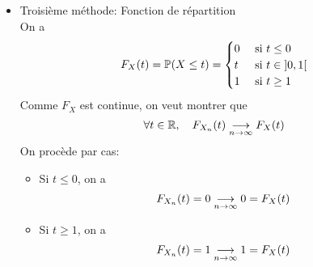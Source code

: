 {\begin{td-sol}
\begin{itemize}[\ptr{}]
            Pour \(t=0\), on a
            \begin{equation*}
                \varphi(X_n)(0)=1 \cvn \varphi_U(0)
            \end{equation*}


            \item Troisième méthode: Fonction de répartition\\
            On a
            \begin{equation*}
                F_X(t) = \mathbb{P}(X\leq t) = \begin{cases}
                    0&\text{ si }t\leq0\\
                    t&\text{ si }t\in\mathopen{}\left]0,1\right[\mathclose{}\\
                    1&\text{ si }t\geq 1
                \end{cases}
            \end{equation*}
            Comme \(F_X\) est continue, on veut montrer que
            \begin{equation*}
                \forall t\in\mathbb{R},\quad F_{X_n}(t) \underset{n\to\infty}{\longrightarrow} F_X(t)
            \end{equation*}
            On procède par cas:
            \begin{itemize}[\ptr{}]
                \item Si \(t\leq 0\), on a
                \begin{equation*}
                    F_{X_n}(t) = 0\underset{n\to\infty}{\longrightarrow} 0=F_X(t)
                \end{equation*}

                \item Si \(t\geq 1\), on a
                \begin{equation*}
                    F_{X_n}(t) = 1\underset{n\to\infty}{\longrightarrow} 1=F_X(t)
                \end{equation*}


\end{itemize}
\end{itemize}
\end{td-sol}}
